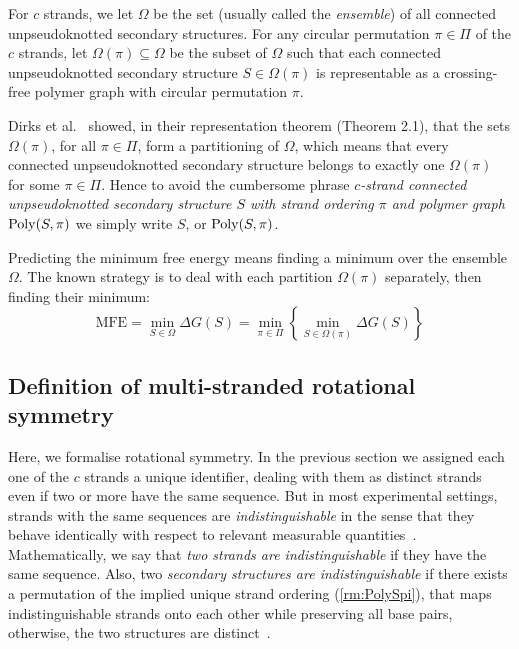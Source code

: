 For $c$ strands, we let $\Omega$ be the set  (usually called the {\em ensemble}) of all  connected unpseudoknotted secondary structures. 
For any circular permutation $\pi \in \Pi$ of the $c$ strands, let $\Omega(\pi) \subseteq \Omega$ be the subset of $\Omega$ such that each connected unpseudoknotted secondary structure $S\in \Omega(\pi)$ is representable as a crossing-free polymer graph with circular permutation $\pi$. 

\begin{remark}[$S$, or $\PolySpi$]\label{rm:PolySpi}
	Dirks et al.~\cite{dirks2007thermodynamic} showed, in their representation theorem (Theorem 2.1), that the sets $\Omega(\pi)$, for all $\pi \in \Pi$, form a partitioning of $\Omega$, which means that every connected unpseudoknotted secondary structure belongs to exactly one $\Omega(\pi)$ for some $\pi \in \Pi$. 
	Hence to avoid the cumbersome phrase 
	{\em $c$-strand connected unpseudoknotted secondary structure $S$ with strand ordering $\pi$ and polymer graph $\PolySpi$}
	we simply write $S$, or $\PolySpi$.
\end{remark}



Predicting the minimum free energy means finding a minimum over the ensemble $\Omega$. 
The known strategy is to deal with each partition $\Omega(\pi)$ separately,  
then finding their minimum:  
\begin{equation}\label{eq:MFE}
	\textrm{MFE} = \min_{S \in \Omega} \Delta G(S)  =\min\limits_{\pi \in \Pi} \left\{ \min_{S \in \Omega(\pi)} \Delta G(S) \right\}  
\end{equation}

\subsection{Definition of multi-stranded rotational symmetry} \label{sec:sym}

Here, we formalise rotational symmetry. 
In the previous section we assigned each one of the $c$ strands a unique identifier, dealing with them as distinct strands even if two or more have the same sequence. 
But in most experimental settings, strands with the same sequences are \emph{indistinguishable}   in the sense that they behave identically with respect to relevant measurable quantities~\cite{dirks2007thermodynamic}. 
Mathematically, we say that {\em two strands are  indistinguishable} if they have the same sequence. 
Also, two \emph{secondary structures are indistinguishable} if there exists a permutation of the implied unique strand ordering (\cref{rm:PolySpi}), 
that maps indistinguishable strands onto each other while preserving all base pairs, otherwise, the two structures are distinct~\cite{dirks2007thermodynamic}.


